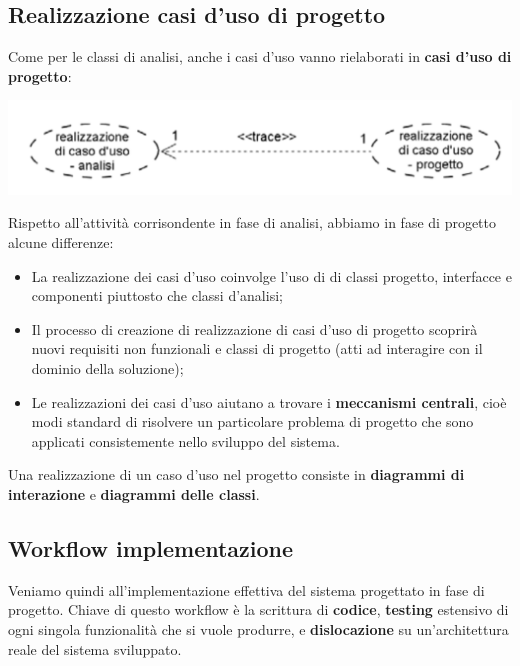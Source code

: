 \documentclass[a4paper,11pt]{article}
\begin{document}
\subsection{Realizzazione casi d'uso di progetto}
Come per le classi di analisi, anche i casi d'uso vanno rielaborati in \textbf{casi d'uso di progetto}:
\begin{center}
	\includegraphics[scale=0.4]{../figures/casi_uso_analisi_progetto.png}
\end{center}
Rispetto all'attività corrisondente in fase di analisi, abbiamo in fase di progetto alcune differenze:
\begin{itemize}
	\item La realizzazione dei casi d'uso coinvolge l'uso di di classi progetto, interfacce e componenti piuttosto che classi d'analisi;
	\item Il processo di creazione di realizzazione di casi d'uso di progetto scoprirà nuovi requisiti non funzionali e classi di progetto (atti ad interagire con il dominio della soluzione);
	\item Le realizzazioni dei casi d'uso aiutano a trovare i \textbf{meccanismi centrali}, cioè modi standard di risolvere un particolare problema di progetto che sono applicati consistemente nello sviluppo del sistema. 
\end{itemize}

Una realizzazione di un caso d’uso nel progetto consiste in \textbf{diagrammi di interazione} e \textbf{diagrammi delle classi}.

\subsection{Workflow implementazione}
Veniamo quindi all'implementazione effettiva del sistema progettato in fase di progetto. Chiave di questo workflow è la scrittura di \textbf{codice}, \textbf{testing} estensivo di ogni singola funzionalità che si vuole produrre, e \textbf{dislocazione} su un'architettura reale del sistema sviluppato.

\newpage
\end{document}
